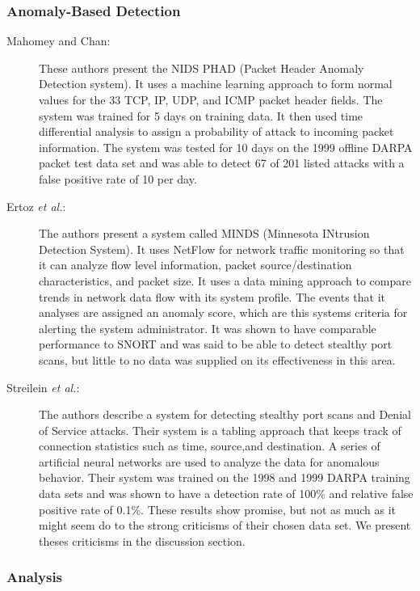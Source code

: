 \documentclass{acm_proc_article-sp}
\begin{document}
		\subsubsection{Anomaly-Based Detection}
		\begin{description}
			\item[Mahomey and Chan:]
				These authors present the NIDS PHAD (Packet Header Anomaly Detection system). It uses a machine learning approach to form normal values for the 33 TCP, IP, UDP, and ICMP packet header fields. The system was trained for 5 days on training data. It then used time differential analysis to assign a probability of attack to incoming packet information. The system was tested for 10 days on the 1999 offline DARPA packet test data set and was able to detect 67 of 201 listed attacks with a false positive rate of 10 per day.
			\item[Ertoz \emph{et al.}:]
				The authors present a system called MINDS (Minnesota INtrusion Detection System). It uses NetFlow for network traffic monitoring so that it can analyze flow level information, packet source/destination characteristics, and packet size. It uses a data mining approach to compare trends in network data flow with its system profile. The events that it analyses are assigned an anomaly score, which are this systems criteria for alerting the system administrator. It was shown to have comparable performance to SNORT and was said to be able to detect stealthy port scans, but little to no data was supplied on its effectiveness in this area.
			\item[Streilein \emph{et al.}:]
			The authors describe a system for detecting stealthy port scans and Denial of Service attacks. Their system is a tabling approach that keeps track of connection statistics such as time, source,and  destination. A series of artificial neural networks are used to analyze the data for anomalous behavior. Their system was trained on the 1998 and 1999 DARPA training data sets and was shown to have a detection rate of 100\% and relative false positive rate of 0.1\%. These results show promise, but not as much as it might seem do to the strong criticisms of their chosen data set. We present theses criticisms in the discussion section. 			
		\end{description}
		
		\subsubsection{Analysis}
		
\end{document}
